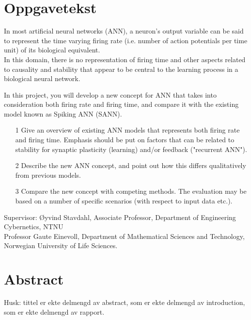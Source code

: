 





%

\newpage
\section{Oppgavetekst}
In most artificial neural networks (ANN),  a neuron's output variable can be said to represent the time varying firing rate (i.e. number of action potentials per time unit) of its biological equivalent.\\
In this domain, there is no representation of firing time and other aspects related to causality and stability that appear to be central to the learning process in a biological neural network.
 
 In this project, you will develop a new concept for ANN that takes into consideration both firing rate and firing time, and compare it with the existing model known as Spiking ANN (SANN).
 \begin{itemize} 
  \item[1] Give an overview of existing ANN models that represents both firing rate and firing time. Emphasis should be put on factors that can be related to stability for synaptic plasticity (learning) and/or feedback ("recurrent ANN").
  \item[2] Describe the new ANN concept, and point out how this differs qualitatively from previous models.
  \item[3] Compare the new concept with competing methods. The evaluation may be based on a number of specific scenarios (with respect to input data etc.).
 \end{itemize}

 Supervisor:      Øyvind Stavdahl, Associate Professor, Department of Engineering Cybernetics, NTNU\\
                  Professor Gaute Einevoll, Department of Mathematical Sciences and Technology, Norwegian University of Life Sciences.
\newpage

\section{Abstract}
Husk: tittel er ekte delmengd av abstract, som er ekte delmengd av introduction, som er ekte delmengd av rapport.

